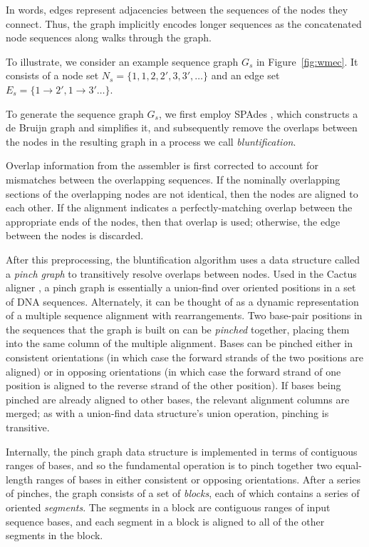 In words, edges represent adjacencies between the sequences of the nodes they connect.
Thus, the graph implicitly encodes longer sequences as the concatenated node sequences along walks through the graph.

To illustrate, we consider an example sequence graph $G_s$ in Figure~\ref{fig:wmec}. It consists of a node set $N_s = \{1, 1, 2, 2', 3, 3', \ldots\}$ 
and an edge set $E_s = \{1 \rightarrow 2', 1 \rightarrow 3' \ldots\}$.

To generate the sequence graph $G_s$, we first employ SPAdes \citep{bankevich2012spades}, which constructs a de Bruijn graph and simplifies it, and subsequently remove the overlaps between the nodes in the resulting graph in a process we call \textit{bluntification}.

Overlap information from the assembler is first corrected to account for mismatches between the overlapping sequences. If the nominally overlapping sections of the overlapping nodes are not identical, then the nodes are aligned to each other. If the alignment indicates a perfectly-matching overlap between the appropriate ends of the nodes, then that overlap is used; otherwise, the edge between the nodes is discarded.

After this preprocessing, the bluntification algorithm uses a data structure called a \textit{pinch graph} to transitively resolve overlaps between nodes. Used in the Cactus aligner \citep{paten2011cactus}, a pinch graph is essentially a union-find over oriented positions in a set of DNA sequences. Alternately, it can be thought of as a dynamic representation of a multiple sequence alignment with rearrangements. Two base-pair positions in the sequences that the graph is built on can be \textit{pinched} together, placing them into the same column of the multiple alignment. Bases can be pinched either in consistent orientations (in which case the forward strands of the two positions are aligned) or in opposing orientations (in which case the forward strand of one position is aligned to the reverse strand of the other position). If bases being pinched are already aligned to other bases, the relevant alignment columns are merged; as with a union-find data structure's union operation, pinching is transitive.

Internally, the pinch graph data structure is implemented in terms of contiguous ranges of bases, and so the fundamental operation is to pinch together two equal-length ranges of bases in either consistent or opposing orientations. After a series of pinches, the graph consists of a set of \textit{blocks}, each of which contains a series of oriented \textit{segments}. The segments in a block are contiguous ranges of input sequence bases, and each segment in a block is aligned to all of the other segments in the block.

